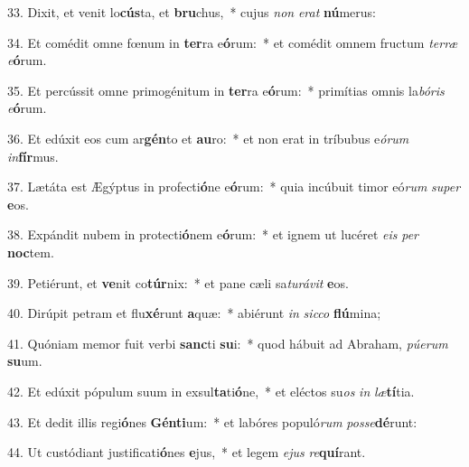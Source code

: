33. Dixit, et venit lo\textbf{cús}ta, et \textbf{bru}chus,~*  cujus \textit{non} \textit{e}\textit{rat} \textbf{nú}merus:\

34. Et comédit omne fœnum in \textbf{ter}ra e\textbf{ó}rum:~*  et comédit omnem fructum \textit{ter}\textit{ræ} \textit{e}\textbf{ó}rum.\

35. Et percússit omne primogénitum in \textbf{ter}ra e\textbf{ó}rum:~*  primítias omnis la\textit{bó}\textit{ris} \textit{e}\textbf{ó}rum.\

36. Et edúxit eos cum ar\textbf{gén}to et \textbf{au}ro:~*  et non erat in tríbubus e\textit{ó}\textit{rum} \textit{in}\textbf{fír}mus.\

37. Lætáta est Ægýptus in profecti\textbf{ó}ne e\textbf{ó}rum:~*  quia incúbuit timor eó\textit{rum} \textit{su}\textit{per} \textbf{e}os.\

38. Expándit nubem in protecti\textbf{ó}nem e\textbf{ó}rum:~*  et ignem ut lucéret \textit{e}\textit{is} \textit{per} \textbf{noc}tem.\

39. Petiérunt, et \textbf{ve}nit co\textbf{túr}nix:~*  et pane cæli sa\textit{tu}\textit{rá}\textit{vit} \textbf{e}os.\

40. Dirúpit petram et flu\textbf{xé}runt \textbf{a}quæ:~*  abiérunt \textit{in} \textit{sic}\textit{co} \textbf{flú}mina;\

41. Quóniam memor fuit verbi \textbf{sanc}ti \textbf{su}i:~*  quod hábuit ad Abraham, \textit{pú}\textit{e}\textit{rum} \textbf{su}um.\

42. Et edúxit pópulum suum in exsul\textbf{ta}ti\textbf{ó}ne,~*  et eléctos su\textit{os} \textit{in} \textit{læ}\textbf{tí}tia.\

43. Et dedit illis regi\textbf{ó}nes \textbf{Gén}\textbf{ti}um:~*  et labóres populó\textit{rum} \textit{pos}\textit{se}\textbf{dé}runt:\

44. Ut custódiant justificati\textbf{ó}nes \textbf{e}jus,~*  et legem \textit{e}\textit{jus} \textit{re}\textbf{quí}rant.\

